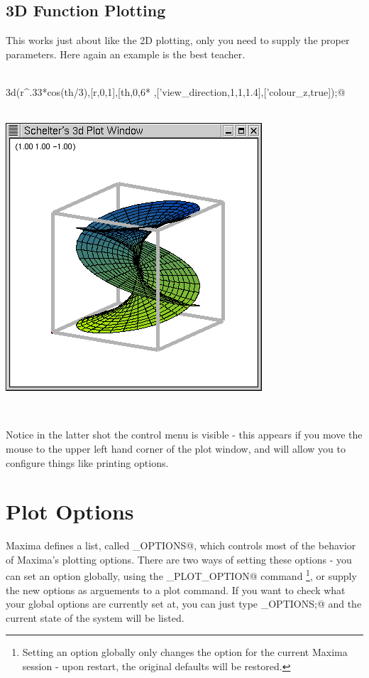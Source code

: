 \subsection{3D Function Plotting}

This works just about like the 2D plotting, only you need to supply the proper parameters.  Here again an example is the best teacher.

~\\
\verb@Plot3d(r^.33*cos(th/3),[r,0,1],[th,0,6*%pi],['grid,12,80],@\\
,['view_direction,1,1,1.4],['colour_z,true]);@\\
~\\
{\centering \includegraphics{images/3dplotwindow} \par }

~

Notice in the latter shot the control menu is visible - this appears if you move the mouse to the upper left hand corner of the plot window, and will allow you to configure things like printing options.

\section{Plot Options}



Maxima defines a list, called \verb@PLOT_OPTIONS@, which controls most of the behavior of Maxima's plotting options.  There are two ways of setting these options - you can set an option globally, using the \verb@SET_PLOT_OPTION@ command \footnote{Setting an option globally only changes the option for the current Maxima session - upon restart, the original defaults will be restored.}, or supply the new options as arguements to a plot command.  If you want to check what your global options are currently set at, you can just type \verb@PLOT_OPTIONS;@ and the current state of the system will be listed.

